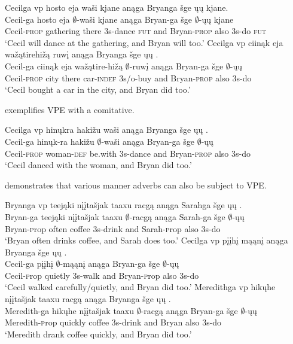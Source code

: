\documentclass[output=paper]{LSP/langsci}
\begin{document}
\ea\label{ex:johnson:8}
\ea
\glll Cecilga {\ob}{vp} hosto eja waši{\cb} kjane anąga Bryanga šge {\ob}ųų{\cb} kjane.\\
Cecil-ga {} hosto eja $\emptyset$-waši kjane anąga Bryan-ga šge $\emptyset$-ųų kjane\\
Cecil-\textsc{prop} {} gathering there {\textsc 3s}-dance \textsc{fut} and Bryan-\textsc{prop} also {\textsc 3s}-do \textsc{fut}\\
\trans `Cecil will dance at the gathering, and Bryan will too.'
\ex
\glll Cecilga {\ob}{vp} ciinąk eja wažątirehižą ruwį{\cb} anąga Bryanga šge {\ob}ųų{\cb} .\\
Cecil-ga {} ciinąk eja wažątire-hižą $\emptyset$-ruwį anąga Bryan-ga šge $\emptyset$-ųų\\
Cecil-\textsc{prop} {} city there car-\textsc{indef} {\textsc 3s/o}-buy and Bryan-\textsc{prop} also {\textsc 3s}-do\\
\trans `Cecil bought a car in the city, and Bryan did too.'
\z
\z

 exemplifies VPE with a comitative.

\ea\label{ex:johnson:9}
\glll Cecilga {\ob}{vp} hinųkra hakižu waši{\cb} anąga Bryanga šge {\ob}ųų{\cb} .\\
Cecil-ga {} hinųk-ra hakižu $\emptyset$-waši anąga Bryan-ga šge $\emptyset$-ųų\\
Cecil-\textsc{prop} {} woman-\textsc{def} be.with {\textsc 3s}-dance and Bryan-\textsc{prop} also {\textsc 3s}-do\\
\trans `Cecil danced with the woman, and Bryan did too.'
\z

 demonstrates that various manner adverbs can also be subject to VPE.

\ea\label{ex:johnson:10}
\ea
\glll Bryanga  {\ob}{vp} teejąki {nįįtašjak taaxu} racgą{\cb} anąga Sarahga šge {\ob}ųų{\cb} .\\ 
Bryan-ga {} teejąki {nįįtašjak taaxu} $\emptyset$-racgą anąga Sarah-ga šge $\emptyset$-ųų\\
Bryan-{\textsc prop} {} often coffee {\textsc 3s}-drink and Sarah-{\textsc prop} also {\textsc 3s}-do\\
\trans `Bryan often drinks coffee, and Sarah does too.'
\ex
\glll Cecilga  {\ob}{vp} pįįhį mąąnį{\cb} anąga Bryanga šge {\ob}ųų{\cb} .\\
Cecil-ga {} pįįhį $\emptyset$-mąąnį anąga Bryan-ga šge $\emptyset$-ųų\\
Cecil-{\textsc prop} {} quietly {\textsc 3s}-walk and Bryan-{\textsc prop} also {\textsc 3s}-do\\
\trans `Cecil walked carefully/quietly, and Bryan did too.'
\ex
\glll Meredithga {\ob}{vp} hikųhe {nįįtašjak taaxu} racgą{\cb} anąga Bryanga šge {\ob}ųų{\cb} .\\
Meredith-ga {} hikųhe {nįįtašjak taaxu} $\emptyset$-racgą anąga Bryan-ga šge $\emptyset$-ųų\\
Meredith-{\textsc prop} {} quickly coffee {\textsc 3s}-drink and Bryan also {\textsc 3s}-do\\
\trans `Meredith drank coffee quickly, and Bryan did too.'
\z
\z
\end{document}
